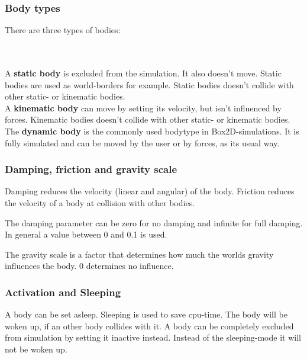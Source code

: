 \documentclass[10pt,a4paper,DIV=11]{scrreprt}
\begin{document}
\subsubsection*{Body types}
There are three types of bodies:

   \\
\\

A \textbf{static body} is excluded from the simulation. It also doesn't move. Static bodies are used as world-borders for example. Static bodies doesn't collide with other static- or kinematic bodies. \\

A \textbf{kinematic body} can move by setting its velocity, but isn't influenced by forces.
Kinematic bodies doesn't collide with other static- or kinematic bodies.\\

The \textbf{dynamic body} is the commonly used bodytype in Box2D-simulations. It is fully simulated and can be moved by the user or by forces, as its usual way.

\subsubsection*{Damping, friction and gravity scale}
Damping reduces the velocity (linear and angular) of the body.
Friction reduces the velocity of a body at collision with other bodies.

The damping parameter can be zero for no damping and infinite for full damping. In general a value between 0 and 0.1 is used.

The gravity scale is a factor that determines how much the worlds gravity influences the body. 0 determines no influence.

\subsubsection*{Activation and Sleeping}
A body can be set asleep. Sleeping is used to save cpu-time. The body will be woken up, if an other body collides with it.
A body can be completely excluded from simulation by setting it inactive instead.
Instead of the sleeping-mode it will not be woken up.
\end{document}
